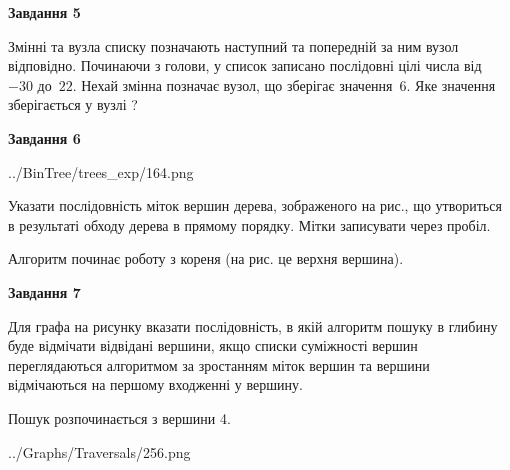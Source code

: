 \documentclass[12pt, ukrainian]{article}
\begin{document}
{\begin {large}
{\begin {center}\textbf{Завдання 5}\end {center}}\par
Змінні  та  вузла списку позначають наступний та попередній за ним вузол відповідно. Починаючи з голови, у список записано послідовні цілі числа від~$-30$ до~$22$. Нехай змінна  позначає вузол, що зберігає значення~$6$.
Яке значення зберігається у вузлі  ?\par
\newpage

{\begin {center}\textbf{Завдання 6}\end {center}}\par

\begin{center}
	{../BinTree/trees_exp/164.png}
\end{center}
Указати послідовність міток вершин дерева, зображеного на рис., що утвориться в результаті обходу дерева в прямому порядку. Мітки записувати через пробіл.\par Алгоритм починає роботу з кореня (на рис. це верхня вершина).\par
\newpage

{\begin {center}\textbf{Завдання 7}\end {center}}\par
Для графа на рисунку вказати послідовність, в якій алгоритм пошуку в глибину буде відмічати відвідані вершини, якщо списки суміжності вершин переглядаються алгоритмом за зростанням міток вершин та вершини відмічаються на першому вход\-женні у вершину.\par
Пошук розпочинається з вершини 4.\par

\begin{center}
	{../Graphs/Traversals/256.png}
\end{center}\par
\newpage


\end{large}}
\end{document}
